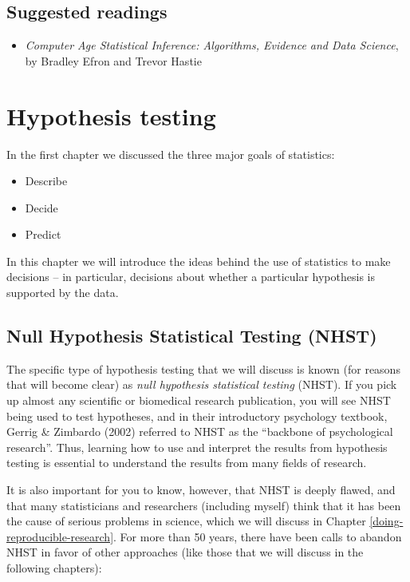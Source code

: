 \documentclass[
  12pt,
]{book}
\providecommand{\tightlist}{%
  \setlength{\itemsep}{0pt}\setlength{\parskip}{0pt}}
\begin{document}
\hypertarget{suggested-readings-5}{%
\section{Suggested readings}\label{suggested-readings-5}}

\begin{itemize}
\tightlist
\item
  \emph{Computer Age Statistical Inference: Algorithms, Evidence and Data Science}, by Bradley Efron and Trevor Hastie
\end{itemize}

\hypertarget{hypothesis-testing}{%
\chapter{Hypothesis testing}\label{hypothesis-testing}}

In the first chapter we discussed the three major goals of statistics:

\begin{itemize}
\tightlist
\item
  Describe
\item
  Decide
\item
  Predict
\end{itemize}

In this chapter we will introduce the ideas behind the use of statistics to make decisions -- in particular, decisions about whether a particular hypothesis is supported by the data.

\hypertarget{null-hypothesis-statistical-testing-nhst}{%
\section{Null Hypothesis Statistical Testing (NHST)}\label{null-hypothesis-statistical-testing-nhst}}

The specific type of hypothesis testing that we will discuss is known (for reasons that will become clear) as \emph{null hypothesis statistical testing} (NHST). If you pick up almost any scientific or biomedical research publication, you will see NHST being used to test hypotheses, and in their introductory psychology textbook, Gerrig \& Zimbardo (2002) referred to NHST as the ``backbone of psychological research''. Thus, learning how to use and interpret the results from hypothesis testing is essential to understand the results from many fields of research.

It is also important for you to know, however, that NHST is deeply flawed, and that many statisticians and researchers (including myself) think that it has been the cause of serious problems in science, which we will discuss in Chapter \ref{doing-reproducible-research}. For more than 50 years, there have been calls to abandon NHST in favor of other approaches (like those that we will discuss in the following chapters):
\end{document}
